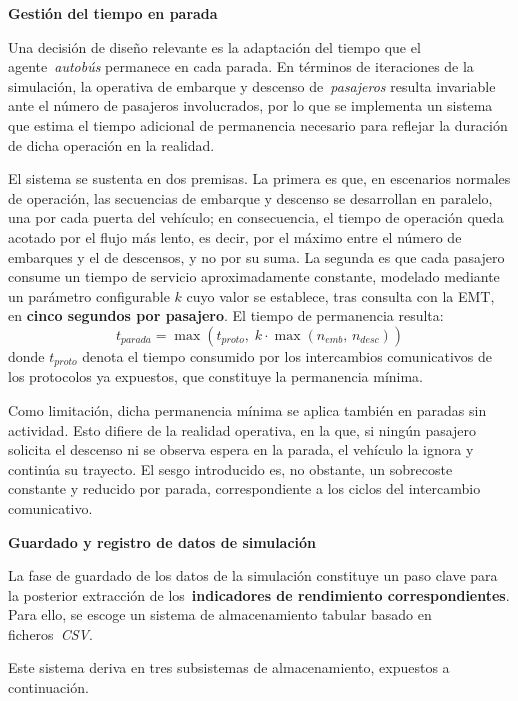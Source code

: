 \medskip
\noindent\textbf{Gestión del tiempo en parada}

Una decisión de diseño relevante es la adaptación del tiempo que el
agente~\textit{autobús} permanece en cada parada. En términos de iteraciones de
la simulación, la operativa de embarque y descenso de~\textit{pasajeros} resulta
invariable ante el número de pasajeros involucrados, por lo que se implementa un
sistema que estima el tiempo adicional de permanencia necesario para reflejar la
duración de dicha operación en la realidad.

El sistema se sustenta en dos premisas. La primera es que, en escenarios
normales de operación, las secuencias de embarque y descenso se desarrollan en
paralelo, una por cada puerta del vehículo; en consecuencia, el tiempo de
operación queda acotado por el flujo más lento, es decir, por el máximo entre el
número de embarques y el de descensos, y no por su suma. La segunda es que cada
pasajero consume un tiempo de servicio aproximadamente constante, modelado
mediante un parámetro configurable $k$ cuyo valor se establece, tras consulta
con la EMT, en \textbf{cinco segundos por pasajero}. El tiempo de permanencia resulta:
\begin{equation}
    t_{parada} = \max\left(t_{proto},\; k \cdot \max(n_{emb},\, n_{desc})\right)
    \label{eq:tiempo_parada}
\end{equation}
donde $t_{proto}$ denota el tiempo consumido por los intercambios comunicativos
de los protocolos ya expuestos, que constituye la permanencia mínima.

Como limitación, dicha permanencia mínima se aplica también en paradas sin
actividad. Esto difiere de la realidad operativa, en la que, si ningún pasajero
solicita el descenso ni se observa espera en la parada, el vehículo la ignora y
continúa su trayecto. El sesgo introducido es, no obstante, un sobrecoste
constante y reducido por parada, correspondiente a los ciclos del intercambio
comunicativo.


\medskip
\noindent\textbf{Guardado y registro de datos de simulación}

La fase de guardado de los datos de la simulación constituye un paso clave para la posterior extracción de los~\textbf{indicadores
de rendimiento correspondientes}. Para ello, se escoge un sistema de almacenamiento tabular basado en ficheros~\textit{CSV}.

Este sistema deriva en tres subsistemas de almacenamiento, expuestos a continuación.

